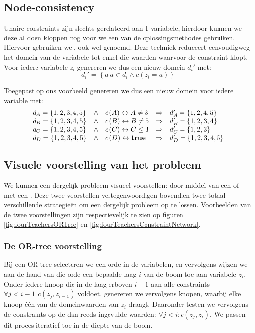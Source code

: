 \subsection{Node-consistency}
Unaire constraints zijn slechts gerelateerd aan 1 variabele, hierdoor kunnen we deze al doen kloppen nog voor we een van de oplossingsmethodes gebruiken. Hiervoor gebruiken we , ook wel  genoemd. Deze techniek reduceert eenvoudigweg het domein van de variabele tot enkel die waarden waarvoor de constraint klopt. Voor iedere variabele $z_i$ genereren we dus een nieuw domein $d_i'$ met:
\begin{equation}
d_i'=\left\{a|a\in d_i\wedge c\left(z_i=a\right)\right\}
\end{equation}
\begin{leftbar}
Toegepast op ons voorbeeld genereren we dus een nieuw domein voor iedere variable met:
\begin{equation}
\begin{array}{lclcl}
d_A=\left\{1,2,3,4,5\right\}&\wedge&c\left(A\right)\leftrightarrow A\neq 3&\Rightarrow&d_A'=\left\{1,2,4,5\right\}\\
d_B=\left\{1,2,3,4,5\right\}&\wedge&c\left(B\right)\leftrightarrow B\neq 5&\Rightarrow&d_B'=\left\{1,2,3,4\right\}\\
d_C=\left\{1,2,3,4,5\right\}&\wedge&c\left(C\right)\leftrightarrow C\leq 3&\Rightarrow&d_C'=\left\{1,2,3\right\}\\
d_D=\left\{1,2,3,4,5\right\}&\wedge&c\left(D\right)\leftrightarrow\mbox{\bf true}&\Rightarrow&d_D'=\left\{1,2,3,4,5\right\}
\end{array}
\end{equation}
\end{leftbar}
\subsection{Visuele voorstelling van het probleem}
We kunnen een dergelijk probleem visueel voorstellen: door middel van een  of met een . Deze twee voorstellen vertegenwoordigen bovendien twee totaal verschillende strategieën om een dergelijk probleem op te lossen. Voorbeelden van de twee voorstellingen zijn respectievelijk te zien op figuren \ref{fig:fourTeachersORTree} en \ref{fig:fourTeachersConstraintNetwork}.
\subsubsection{De OR-tree voorstelling}
Bij een OR-tree selecteren we een orde in de variabelen, en vervolgens wijzen we aan de hand van die orde een bepaalde laag $i$ van de boom toe aan variabele $z_i$. Onder iedere knoop die in de laag erboven $i-1$ aan alle constraints $\forall j<i-1: c\left(z_j,z_{i-1}\right)$ voldoet, genereren we vervolgens knopen, waarbij elke knoop één van de domeinwaarden van $z_i$ draagt. Daaronder testen we vervolgens de constraints op de dan reeds ingevulde waarden: $\forall j<i: c\left(z_j,z_{i}\right)$. We passen dit proces iteratief toe in de diepte van de boom.
